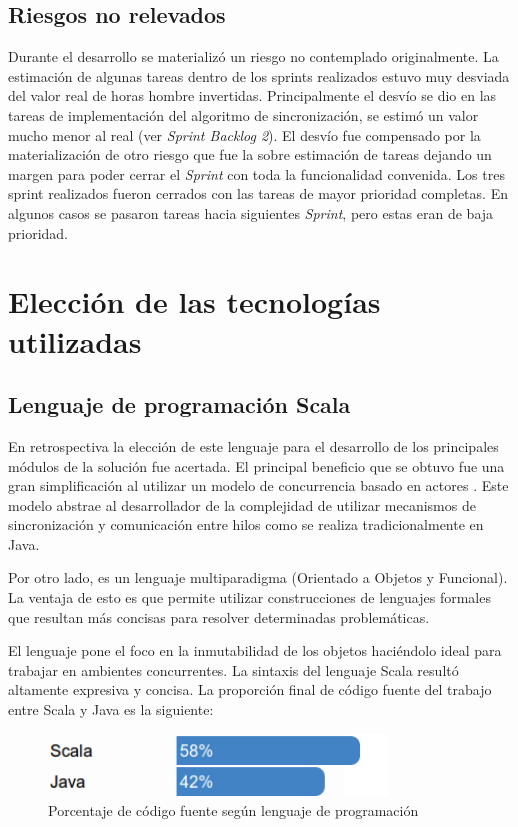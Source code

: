 \documentclass[12pt,a4paper]{article}
\let\stdsection\section
\renewcommand\section{\newpage\stdsection}
\begin{document}
\subsection{Riesgos no relevados}
Durante el desarrollo se materializó un riesgo no contemplado originalmente. La estimación de algunas tareas dentro
de los sprints realizados estuvo muy desviada del valor real de horas hombre invertidas. Principalmente el desvío se
dio en las tareas de implementación del algoritmo de sincronización, se estimó un valor mucho menor al real (ver
\textit{Sprint Backlog 2}). El desvío fue compensado por la materialización de otro riesgo que fue la sobre estimación
de tareas dejando un margen para poder cerrar el \textit{Sprint} con toda la funcionalidad convenida.
Los tres sprint realizados fueron cerrados con las tareas de mayor prioridad completas. En algunos casos se pasaron 
tareas hacia siguientes \textit{Sprint}, pero estas eran de baja prioridad.

\section{Elección de las tecnologías utilizadas}

\subsection{Lenguaje de programación Scala}
En retrospectiva la elección de este lenguaje para el desarrollo de los principales módulos de la solución fue
acertada. El principal beneficio que se obtuvo fue una gran simplificación al utilizar un modelo de concurrencia
basado en actores \cite{actors1,actors2}. Este modelo abstrae al desarrollador de la complejidad de utilizar
mecanismos de sincronización y comunicación entre hilos como se realiza tradicionalmente en Java.

Por otro lado, es un lenguaje multiparadigma (Orientado a Objetos y Funcional). La ventaja de esto es que permite 
utilizar construcciones de lenguajes formales que resultan más concisas para resolver determinadas problemáticas.

El lenguaje pone el foco en la inmutabilidad de los objetos haciéndolo ideal para trabajar en ambientes concurrentes.
La sintaxis del lenguaje Scala resultó altamente expresiva y concisa. La proporción final de código fuente del trabajo
entre Scala y Java es la siguiente:

	\begin{figure}[!ht]
		\begin{center}
			\includegraphics[width=9cm]{porcentaje.png}
			\caption{\label{porcentaje} Porcentaje de código fuente según lenguaje de programación }
		\end{center}
	\end{figure}
\end{document}
